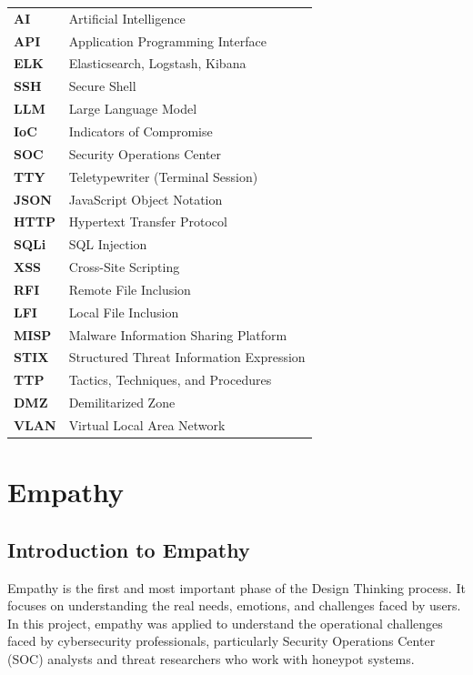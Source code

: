 \documentclass[12pt,a4paper]{report}
\begin{document}
\begin{tabular}{p{4cm} p{10cm}}

\textbf{AI} & Artificial Intelligence \\
\textbf{API} & Application Programming Interface \\
\textbf{ELK} & Elasticsearch, Logstash, Kibana \\
\textbf{SSH} & Secure Shell \\
\textbf{LLM} & Large Language Model \\
\textbf{IoC} & Indicators of Compromise \\
\textbf{SOC} & Security Operations Center \\
\textbf{TTY} & Teletypewriter (Terminal Session) \\
\textbf{JSON} & JavaScript Object Notation \\
\textbf{HTTP} & Hypertext Transfer Protocol \\
\textbf{SQLi} & SQL Injection \\
\textbf{XSS} & Cross-Site Scripting \\
\textbf{RFI} & Remote File Inclusion \\
\textbf{LFI} & Local File Inclusion \\
\textbf{MISP} & Malware Information Sharing Platform \\
\textbf{STIX} & Structured Threat Information Expression \\
\textbf{TTP} & Tactics, Techniques, and Procedures \\
\textbf{DMZ} & Demilitarized Zone \\
\textbf{VLAN} & Virtual Local Area Network \\

\end{tabular}

\chapter{Empathy}
\thispagestyle{fancy}

\section{Introduction to Empathy}

Empathy is the first and most important phase of the Design Thinking process. It focuses on understanding the real needs, emotions, and challenges faced by users. In this project, empathy was applied to understand the operational challenges faced by cybersecurity professionals, particularly Security Operations Center (SOC) analysts and threat researchers who work with honeypot systems.
\end{document}
